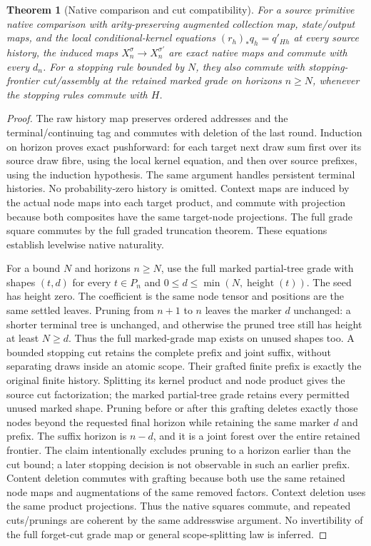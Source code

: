 \documentclass[11pt]{article}
\newtheorem{theorem}{Theorem}\newtheorem{proposition}[theorem]{Proposition}
\begin{document}
\begin{theorem}[Native comparison and cut compatibility]
For a source primitive native comparison with arity-preserving augmented collection map, state/output maps, and the local conditional-kernel equations $(r_h)_*q_h=q'_{Hh}$ at every source history, the induced maps $X_n^\sigma\to X_n^{\sigma'}$ are exact native maps and commute with every $d_n$. For a stopping rule bounded by $N$, they also commute with stopping-frontier cut/assembly at the retained marked grade on horizons $n\geq N$, whenever the stopping rules commute with $H$.
\end{theorem}
\begin{proof}
The raw history map preserves ordered addresses and the terminal/continuing tag and commutes with deletion of the last round. Induction on horizon proves exact pushforward: for each target next draw sum first over its source draw fibre, using the local kernel equation, and then over source prefixes, using the induction hypothesis. The same argument handles persistent terminal histories. No probability-zero history is omitted. Context maps are induced by the actual node maps into each target product, and commute with projection because both composites have the same target-node projections. The full grade square commutes by the full graded truncation theorem. These equations establish levelwise native naturality.

For a bound $N$ and horizons $n\geq N$, use the full marked partial-tree grade with shapes $(t,d)$ for every $t\in P_n$ and $0\leq d\leq\min(N,\operatorname{height}(t))$. The seed has height zero. The coefficient is the same node tensor and positions are the same settled leaves. Pruning from $n+1$ to $n$ leaves the marker $d$ unchanged: a shorter terminal tree is unchanged, and otherwise the pruned tree still has height at least $N\geq d$. Thus the full marked-grade map exists on unused shapes too. A bounded stopping cut retains the complete prefix and joint suffix, without separating draws inside an atomic scope. Their grafted finite prefix is exactly the original finite history. Splitting its kernel product and node product gives the source cut factorization; the marked partial-tree grade retains every permitted unused marked shape. Pruning before or after this grafting deletes exactly those nodes beyond the requested final horizon while retaining the same marker $d$ and prefix. The suffix horizon is $n-d$, and it is a joint forest over the entire retained frontier. The claim intentionally excludes pruning to a horizon earlier than the cut bound; a later stopping decision is not observable in such an earlier prefix. Content deletion commutes with grafting because both use the same retained node maps and augmentations of the same removed factors. Context deletion uses the same product projections. Thus the native squares commute, and repeated cuts/prunings are coherent by the same addresswise argument. No invertibility of the full forget-cut grade map or general scope-splitting law is inferred.
\end{proof}
\end{document}
